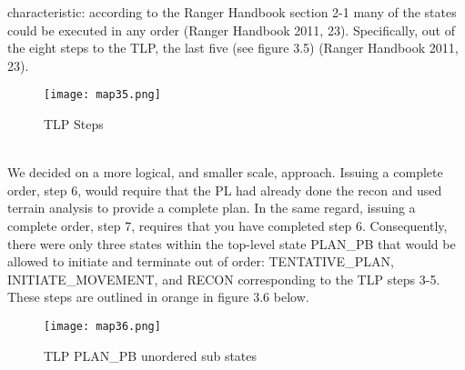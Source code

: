characteristic: according to the Ranger Handbook section 2-1 many of the states
could be executed in any order (Ranger Handbook 2011, 23). Specifically, out of
the eight steps to the TLP, the last five (see figure 3.5) (Ranger Handbook 2011,
23).\\
\begin{figure}[h]
  \centering
  \texttt{[image: map35.png]}
  \caption{TLP Steps}
\end{figure}\\
We decided on a more logical, and smaller scale, approach. Issuing a complete order,
step 6, would require that the PL had already done the recon and used terrain analysis
to provide a complete plan. In the same regard, issuing a complete order, step 7,
requires that you have completed step 6. Consequently, there were only three states
within the top-level state PLAN_PB that would be allowed to initiate and terminate
out of order: TENTATIVE_PLAN, INITIATE_MOVEMENT, and RECON corresponding to the TLP
steps 3-5. These steps are outlined in orange in figure 3.6 below.\\
\begin{figure}[h]
  \centering
  \texttt{[image: map36.png]}
  \caption{TLP PLAN_PB unordered sub states}
\end{figure}\\ \\


